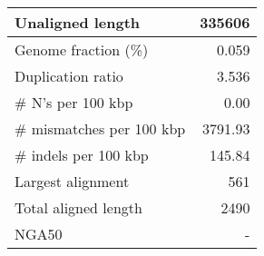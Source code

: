 \documentclass[12pt,a4paper]{article}
\begin{document}
\begin{table}[ht]
\begin{center}
\begin{tabular}{|l*{1}{|r}|}
Unaligned length & 335606 \\ \hline
Genome fraction (\%) & 0.059 \\ \hline
Duplication ratio & 3.536 \\ \hline
\# N's per 100 kbp & 0.00 \\ \hline
\# mismatches per 100 kbp & 3791.93 \\ \hline
\# indels per 100 kbp & 145.84 \\ \hline
Largest alignment & 561 \\ \hline
Total aligned length & 2490 \\ \hline
NGA50 & - \\ \hline
\end{tabular}
\end{center}
\end{table}
\end{document}
